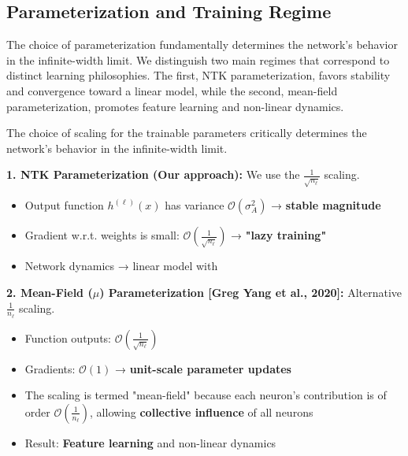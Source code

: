 \documentclass[a4paper]{article}
\newcommand{\Kop}{\textcolor{kernelcolor}{\mathbf{K}}}
\newcommand{\Kop}{\textcolor{kernelcolor}{\mathbf{K}}}
\newcommand{\Kop}{\textcolor{kernelcolor}{\mathbf{K}}}
\theoremstyle{plain}
\theoremstyle{definition}
\theoremstyle{remark}
\begin{document}
\subsection{Parameterization and Training Regime}

The choice of parameterization fundamentally determines the network's behavior in the infinite-width limit. We distinguish two main regimes that correspond to distinct learning philosophies. The first, NTK parameterization, favors stability and convergence toward a linear model, while the second, mean-field parameterization, promotes feature learning and non-linear dynamics.

\begin{tcolorbox}[colback=green!5,colframe=green!80!black,title={\textbf{Remark: Critical Parameterization Choice}},enhanced,drop shadow,boxrule=2pt]
The choice of scaling for the trainable parameters critically determines the network's behavior in the infinite-width limit. 

\textbf{1. NTK Parameterization (Our approach):} We use the $\frac{1}{\sqrt{n_\ell}}$ scaling.
\begin{itemize}
\item Output function $h^{(\ell)}(x)$ has variance $\mathcal{O}(\sigma_A^2)$ → \textbf{stable magnitude}
\item Gradient w.r.t. weights is small: $\mathcal{O}(\frac{1}{\sqrt{n_\ell}})$ → \textbf{"lazy training"}
\item Network dynamics → linear model with \Kop
\end{itemize}

\textbf{2. Mean-Field ($\mu$) Parameterization [Greg Yang et al., 2020]:} Alternative $\frac{1}{n_\ell}$ scaling.
\begin{itemize}
\item Function outputs: $\mathcal{O}(\frac{1}{\sqrt{n_\ell}})$
\item Gradients: $\mathcal{O}(1)$ → \textbf{unit-scale parameter updates}
\item The scaling is termed "mean-field" because each neuron's contribution is of order $\mathcal{O}(\frac{1}{n_\ell})$, allowing \textbf{collective influence} of all neurons
\item Result: \textbf{Feature learning} and non-linear dynamics
\end{itemize}

\end{tcolorbox}
\end{document}
